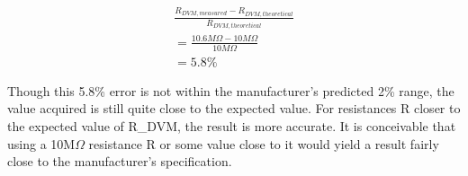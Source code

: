 \begin{equation}
	\label{eq:vdvm_error}
	\begin{gathered}
		\frac{R_{DVM, measured} - R_{DVM, theoretical}}{R_{DVM, theoretical}}\\
	= \frac{10.6 M\Omega - 10 M\Omega}{10 M\Omega}\\
	= 5.8\%
	\end{gathered}
\end{equation}

Though this 5.8\% error is not within the manufacturer's predicted 2\% range, the value acquired is still quite close to the expected value. For resistances R closer to the expected value of R_{DVM}, the result is more accurate. It is conceivable that using a 10M$\Omega$ resistance R or some value close to it would yield a result fairly close to the manufacturer's specification.
